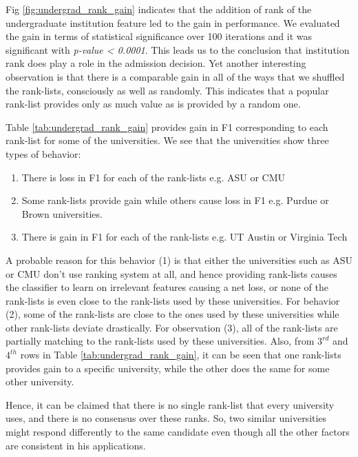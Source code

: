 \documentclass{sig-alternate-05-2015}
\begin{document}
Fig \ref{fig:undergrad_rank_gain} indicates that the addition of rank of the undergraduate institution feature led to the gain in performance. We evaluated the gain in terms of statistical significance over 100 iterations and it was significant with \textit{p-value < 0.0001}. This leads us to the conclusion that institution rank does play a role in the admission decision. Yet another interesting observation is that there is a comparable gain in all of the ways that we shuffled the rank-lists, consciously as well as randomly. This indicates that a popular rank-list provides only as much value as is provided by a random one.

Table \ref{tab:undergrad_rank_gain} provides gain in F1 corresponding to each rank-list for some of the universities. We see that the universities show three types of behavior:
\begin{enumerate}
\item There is loss in F1 for each of the rank-lists e.g. ASU or CMU
\item Some rank-lists provide gain while others cause loss in F1 e.g. Purdue or Brown universities.
\item There is gain in F1 for each of the rank-lists e.g. UT Austin or Virginia Tech
\end{enumerate}

A probable reason for this behavior (1) is that either the universities such as ASU or CMU don't use ranking system at all, and hence providing rank-lists causes the classifier to learn on irrelevant features causing a net loss, or none of the rank-lists is even close to the rank-lists used by these universities. For behavior (2), some of the rank-lists are close to the ones used by these universities while other rank-lists deviate drastically. For observation (3), all of the rank-lists are partially matching to the rank-lists used by these universities. Also, from $3^{rd}$ and $4^{th}$ rows in Table \ref{tab:undergrad_rank_gain}, it can be seen that one rank-lists provides gain to a specific university, while the other does the same for some other university.

Hence, it can be claimed that there is no single rank-list that every university uses, and there is no consensus over these ranks. So, two similar universities might respond differently to the same candidate even though all the other factors are consistent in his applications.
\end{document}

